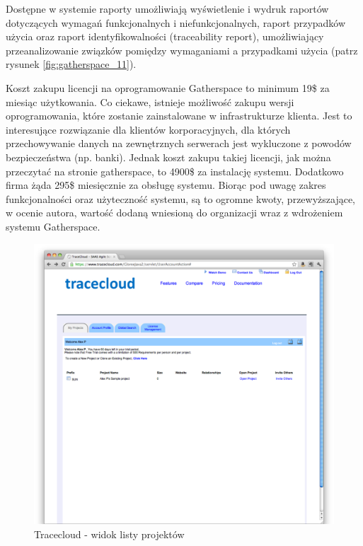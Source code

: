         Dostępne w systemie raporty umożliwiają wyświetlenie i wydruk raportów dotyczących wymagań funkcjonalnych i niefunkcjonalnych, raport przypadków użycia oraz raport identyfikowalności (traceability report), umożliwiający przeanalizowanie związków pomiędzy wymaganiami a przypadkami użycia (patrz rysunek \ref{fig:gatherspace_11}). 

        \pagebreak

        Koszt zakupu licencji na oprogramowanie Gatherspace to minimum 19\$ za miesiąc użytkowania. Co ciekawe, istnieje możliwość zakupu wersji oprogramowania, które zostanie zainstalowane w infrastrukturze klienta. Jest to interesujące rozwiązanie dla klientów korporacyjnych, dla których przechowywanie danych na zewnętrznych serwerach jest wykluczone z powodów bezpieczeństwa (np. banki). Jednak koszt zakupu takiej licencji, jak można przeczytać na stronie gatherspace, to 4900\$ za instalację systemu. Dodatkowo firma żąda 295\$ miesięcznie za obsługę systemu. Biorąc pod uwagę zakres funkcjonalności oraz użyteczność systemu, są to ogromne kwoty, przewyższające, w ocenie autora, wartość dodaną wniesioną do organizacji wraz z wdrożeniem systemu Gatherspace.
         
        \begin{figure}[t]
          \centering
          \includegraphics[width=1.0\textwidth]{img/tracecloud_1.pdf}
          \caption{Tracecloud - widok listy projektów}
          \label{fig:tracecloud_1}
        \end{figure}

